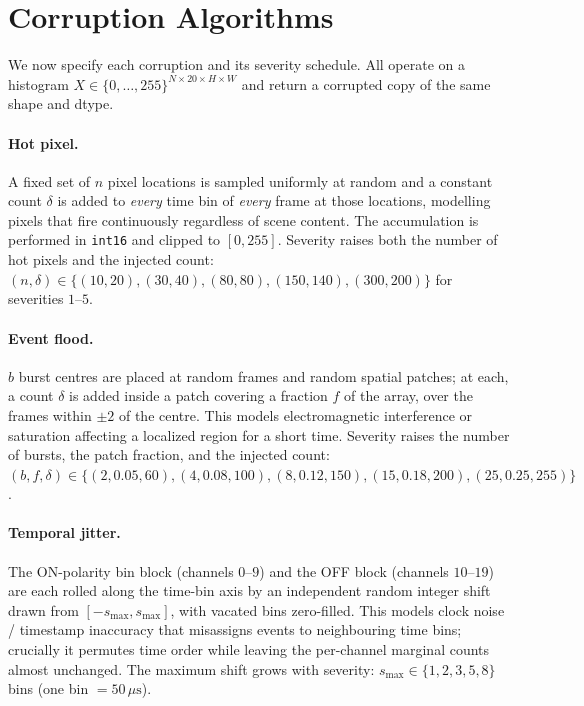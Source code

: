 \section{Corruption Algorithms}
\label{sec:corr-algos}

We now specify each corruption and its severity schedule. All operate on a histogram
$X \in \{0,\dots,255\}^{N\times 20\times H\times W}$ and return a corrupted copy of the same
shape and dtype.

\paragraph{Hot pixel.}
A fixed set of $n$ pixel locations is sampled uniformly at random and a constant count $\delta$
is added to \emph{every} time bin of \emph{every} frame at those locations, modelling pixels
that fire continuously regardless of scene content. The accumulation is performed in
\texttt{int16} and clipped to $[0,255]$. Severity raises both the number of hot pixels and the
injected count: $(n,\delta) \in \{(10,20),(30,40),(80,80),(150,140),(300,200)\}$ for
severities $1$--$5$.

\paragraph{Event flood.}
$b$ burst centres are placed at random frames and random spatial patches; at each, a count
$\delta$ is added inside a patch covering a fraction $f$ of the array, over the frames within
$\pm 2$ of the centre. This models electromagnetic interference or saturation affecting a
localized region for a short time. Severity raises the number of bursts, the patch fraction,
and the injected count: $(b,f,\delta) \in \{(2,0.05,60),(4,0.08,100),(8,0.12,150),(15,0.18,200),(25,0.25,255)\}$.

\paragraph{Temporal jitter.}
The ON-polarity bin block (channels $0$--$9$) and the OFF block (channels $10$--$19$) are each
rolled along the time-bin axis by an independent random integer shift drawn from
$[-s_{\max}, s_{\max}]$, with vacated bins zero-filled. This models clock noise / timestamp
inaccuracy that misassigns events to neighbouring time bins; crucially it permutes time order
while leaving the per-channel marginal counts almost unchanged. The maximum shift grows with
severity: $s_{\max} \in \{1,2,3,5,8\}$ bins (one bin $=50\,\mu\text{s}$).

